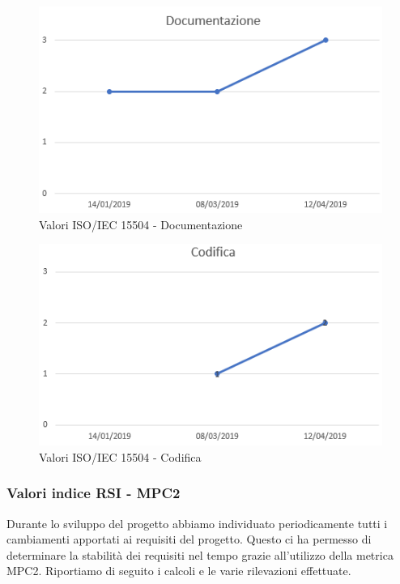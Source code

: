 \begin{figure}[H]
	\centering
	\includegraphics[scale=1]{images/resoconto/Documentazione.png}
	\caption{Valori ISO/IEC 15504 - Documentazione}	
\end{figure}


\begin{figure}[H]
	\centering
	\includegraphics[scale=1]{images/resoconto/Codifica.png}
	\caption{Valori ISO/IEC 15504 - Codifica}	
\end{figure}
\newpage
\subsubsection{Valori indice RSI - MPC2\\}
Durante lo sviluppo del progetto abbiamo individuato periodicamente tutti i cambiamenti apportati ai requisiti del progetto. Questo ci ha permesso di determinare la stabilità dei requisiti nel tempo grazie all'utilizzo della metrica MPC2.
Riportiamo di seguito i calcoli e le varie rilevazioni effettuate.

